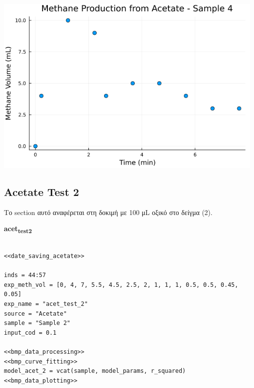 \documentclass[11pt]{article}
\begin{document}
\begin{center}
\includegraphics[width=.9\linewidth]{../plots/BMPs/Acetate/acet_test_4_min.png}
\end{center}

\subsection{Acetate Test 2}
\label{sec:org92dbf40}
Το section αυτό αναφέρεται στη δοκιμή με 100 μL οξικό στο δείγμα (2).

\textbf{acet\textsubscript{test}\textsubscript{2}}
\begin{verbatim}

<<date_saving_acetate>>

inds = 44:57
exp_meth_vol = [0, 4, 7, 5.5, 4.5, 2.5, 2, 1, 1, 1, 0.5, 0.5, 0.45, 0.05]
exp_name = "acet_test_2"
source = "Acetate"
sample = "Sample 2"
input_cod = 0.1

<<bmp_data_processing>>
<<bmp_curve_fitting>>
model_acet_2 = vcat(sample, model_params, r_squared)
<<bmp_data_plotting>>
\end{verbatim}
\end{document}
